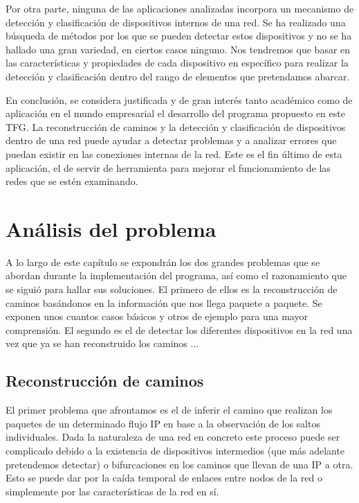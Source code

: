 \documentclass[twoside, 12pt]{epstfg}
\begin{document}
Por otra parte, ninguna de las aplicaciones analizadas incorpora un mecanismo de detección y clasificación de dispositivos internos de una red. Se ha realizado una búsqueda de métodos por los que se pueden detectar estos dispositivos y no se ha hallado una gran variedad, en ciertos casos ninguno. Nos tendremos que basar en las características y propiedades de cada dispositivo en específico para realizar la detección y clasificación dentro del rango de elementos que pretendamos abarcar.

En conclusión, se considera justificada y de gran interés tanto académico como de aplicación en el mundo empresarial el desarrollo del programa propuesto en este TFG. La reconstrucción de caminos y la detección y clasificación de dispositivos dentro de una red puede ayudar a detectar problemas y a analizar errores que puedan existir en las conexiones internas de la red. Este es el fin último de esta aplicación, el de servir de herramienta para mejorar el funcionamiento de las redes que se estén examinando.


\chapter{Análisis del problema}
\label{chap:Analisis}
A lo largo de este capítulo se expondrán los dos grandes problemas que se abordan durante la implementación del programa, así como el razonamiento que se siguió para hallar sus soluciones. El primero de ellos es la reconstrucción de caminos basándonos en la información que nos llega paquete a paquete. Se exponen unos cuantos casos básicos y otros de ejemplo para una mayor comprensión. El segundo es el de detectar los diferentes dispositivos en la red una vez que ya se han reconstruido los caminos ...

\section{Reconstrucción de caminos}
El primer problema que afrontamos es el de inferir el camino que realizan los paquetes de un determinado flujo IP en base a la observación de los saltos individuales. Dada la naturaleza de una red en concreto este proceso puede ser complicado debido a la existencia de dispositivos intermedios (que más adelante pretendemos detectar) o bifurcaciones en los caminos que llevan de una IP a otra. Esto se puede dar por la caída temporal de enlaces entre nodos de la red o simplemente por las características de la red en sí.
\end{document}
